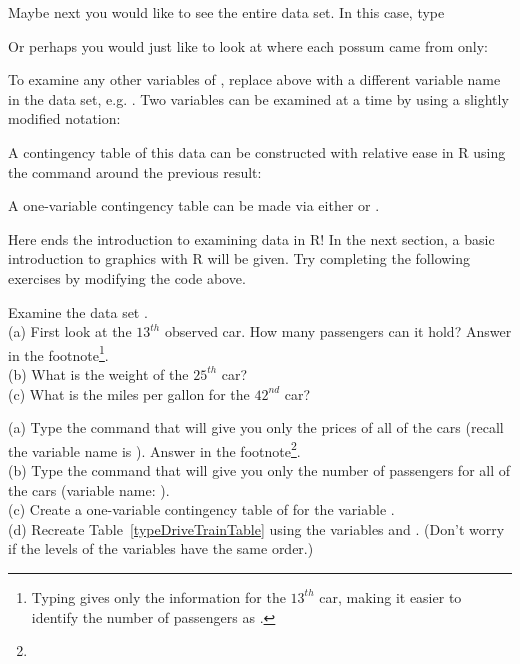Maybe next you would like to see the entire data set. In this case, type \\


Or perhaps you would just like to look at where each possum came from only: \\


To examine any other variables of , replace  above with a different variable name in the  data set, e.g. . Two variables can be examined at a time by using a slightly modified notation: \\


A contingency table of this data can be constructed with relative ease in R using the  command around the previous result: \\


A one-variable contingency table can be made via either  or .

Here ends the introduction to examining data in R! In the next section, a basic introduction to graphics with R will be given. Try completing the following exercises by modifying the code above. \\

\begin{exercise}
Examine the data set . \\
(a) First look at the $13^{th}$ observed car. How many passengers can it hold? Answer in the footnote\footnote{Typing  gives only the information for the $13^{th}$ car, making it easier to identify the number of passengers as .}. \\
(b) What is the weight of the $25^{th}$ car? \\
(c) What is the miles per gallon for the $42^{nd}$ car?
\end{exercise}

\begin{exercise}
(a) Type the command that will give you only the prices of all of the cars (recall the variable name is ). Answer in the footnote\footnote{}. \\
(b) Type the command that will give you only the number of passengers for all of the cars (variable name: ). \\
(c) Create a one-variable contingency table of for the variable . \\
(d) Recreate Table~\ref{typeDriveTrainTable} using the variables  and . (Don't worry if the levels of the variables have the same order.)
\end{exercise}

